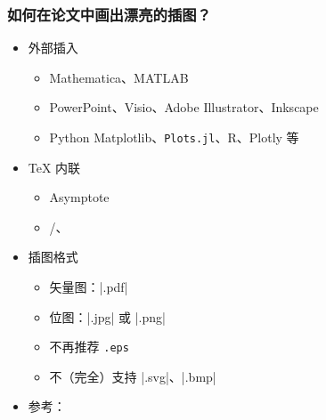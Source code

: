 \begin{frame}[fragile]
\frametitle{如何在论文中画出漂亮的插图？}
\begin{itemize}
  \item<+-> 外部插入

    \begin{itemize}
      \item Mathematica、MATLAB
      \item PowerPoint、Visio、Adobe Illustrator、Inkscape
      \item Python Matplotlib、\texttt{Plots.jl}、R、Plotly 等
    \end{itemize}

  \item<+-> \TeX{} 内联

    \begin{itemize}
      \item Asymptote
      \item \alert{/、}
    \end{itemize}

  \item<+-> 插图格式

    \begin{itemize}
      \item 矢量图：|.pdf|
      \item 位图：|.jpg| 或 |.png|
      \item \alert{不再推荐 \texttt{.eps}}
      \item 不（完全）支持 |.svg|、|.bmp|
    \end{itemize}

  \item<+-> 参考：
\end{itemize}
\end{frame}

